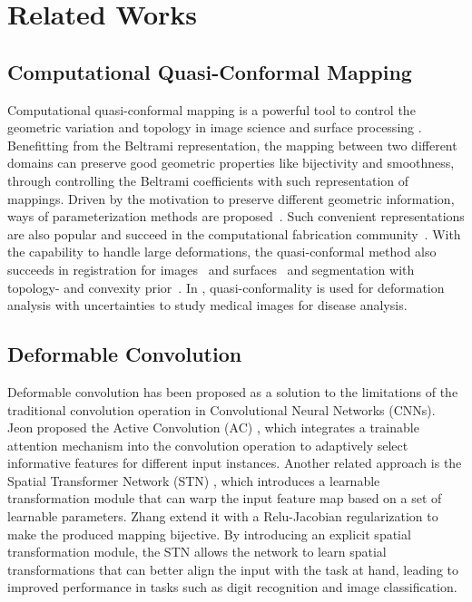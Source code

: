 \section{Related Works}
\subsection{Computational Quasi-Conformal Mapping}
Computational quasi-conformal mapping is a powerful tool to control the geometric variation and topology in image science \cite{lam2014landmark} and surface processing \cite{levy2002least,gu2004genus}. Benefitting from the Beltrami representation, the mapping between two different domains can preserve good geometric properties like bijectivity and smoothness, through controlling the Beltrami coefficients with such representation of mappings. Driven by the motivation to preserve different geometric information, ways of parameterization methods are proposed~\cite{gu2003global}. Such convenient representations are also popular and succeed in the computational fabrication community~\cite{Soliman:2018:OCS,Crane:2013:RFC,panetta2019x}. With the capability to handle large deformations, the quasi-conformal method also succeeds in registration for images~\cite{lam2014landmark} and surfaces~\cite{choi2015fast} and segmentation with topology- and convexity prior~\cite{zhang2021topology,zhang2024qis}. In \cite{zhang2022nondeterministic,zhang2022new}, quasi-conformality is used for deformation analysis with uncertainties to study medical images for disease analysis. 


\subsection{Deformable Convolution}

Deformable convolution has been proposed as a solution to the limitations of the traditional convolution operation in Convolutional Neural Networks (CNNs). Jeon \etal proposed the Active Convolution (AC) \cite{jeon2017active}, which integrates a trainable attention mechanism into the convolution operation to adaptively select informative features for different input instances. Another related approach is the Spatial Transformer Network (STN) \cite{jaderberg2015spatial}, which introduces a learnable transformation module that can warp the input feature map based on a set of learnable parameters. Zhang \etal \cite{zhang2024learning,zhang2023deformation} extend it with a Relu-Jacobian regularization to make the produced mapping bijective. By introducing an explicit spatial transformation module, the STN allows the network to learn spatial transformations that can better align the input with the task at hand, leading to improved performance in tasks such as digit recognition and image classification. 

